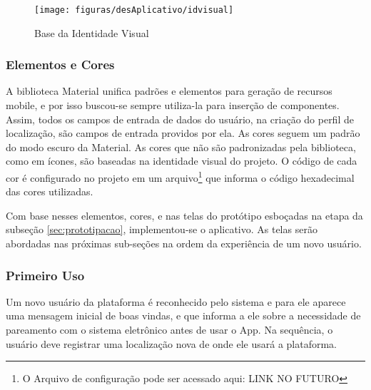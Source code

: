 \begin{figure}[!htb]
	\centering
	\caption{Base da Identidade Visual}
	\texttt{[image: figuras/desAplicativo/idvisual]}
	\label{fig:idvisual}
\end{figure}

\subsubsection{Elementos e Cores}
A biblioteca Material unifica padrões e elementos para geração de recursos mobile, e por isso buscou-se sempre utiliza-la para inserção de componentes. Assim, todos os campos de entrada de dados do usuário, na criação do perfil de localização, são campos de entrada providos por ela. As cores seguem um padrão do modo escuro da Material. As cores que não são padronizadas pela biblioteca, como em ícones, são baseadas na identidade visual do projeto. O código de cada cor é configurado no projeto em um arquivo\footnote{O Arquivo de configuração pode ser acessado aqui: LINK NO FUTURO} que informa o código hexadecimal das cores utilizadas. 


Com base nesses elementos, cores, e nas telas do protótipo esboçadas na etapa da subseção \ref{sec:prototipacao}, implementou-se o aplicativo. As telas serão abordadas nas próximas sub-seções na ordem da experiência de um novo usuário.

\subsubsection{Primeiro Uso}

Um novo usuário da plataforma é reconhecido pelo sistema e para ele aparece uma mensagem inicial de boas vindas, e que informa a ele sobre a necessidade de pareamento com o sistema eletrônico antes de usar o App. Na sequência, o usuário deve registrar uma localização nova de onde ele usará a plataforma. 



